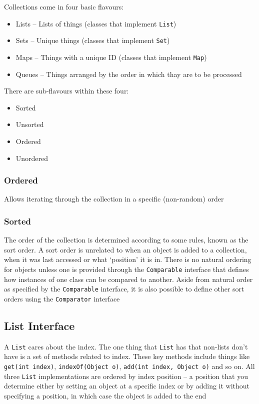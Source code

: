 Collections come in four basic flavours:
\begin{itemize}
    \item Lists -- Lists of things (classes that implement \verb#List#)
    \item Sets -- Unique things (classes that implement \verb#Set#)
    \item Maps -- Things with a unique ID (classes that implement \verb#Map#)
    \item Queues -- Things arranged by the order in which thay are to be 
    processed
\end{itemize}
There are sub-flavours within these four:
\begin{itemize}
    \item Sorted
    \item Unsorted
    \item Ordered
    \item Unordered
\end{itemize}

\subsubsection{Ordered}
Allows iterating through the collection in a specific (non-random) order

\subsubsection{Sorted}
The order of the collection is determined according to some rules, known as the 
sort order. A sort order is unrelated to when an object is added to a 
collection, when it was last accessed or what `position' it is in. There is no 
natural ordering for objects unless one is provided through the 
\verb#Comparable# interface that defines how instances of one class can be 
compared to another. Aside from natural order as specified by the 
\verb#Comparable# interface, it is also possible to define other sort orders 
using the \verb#Comparator# interface

\subsection{List Interface}
A \verb#List# cares about the index. The one thing that \verb#List# has that 
non-lists don't have is a set of methods related to index. These key methods 
include things like \verb#get(int index)#, \verb#indexOf(Object o)#, 
\verb#add(int index, Object o)# and so on. All three \verb#List# 
implementations are ordered by index position -- a position that you determine 
either by setting an object at a specific index or by adding it without 
specifying a position, in which case the object is added to the end

